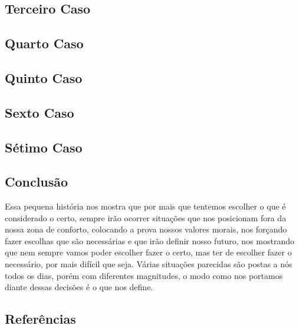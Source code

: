 \documentclass[12pt]{article}
\begin{document}
\subsection{Terceiro Caso} \label{sec:3sec}
\subsection{Quarto Caso} \label{sec:4sec}
\subsection{Quinto Caso} \label{sec:5sec}
\subsection{Sexto Caso} \label{sec:6sec}
\subsection{Sétimo Caso} \label{sec:7sec}

\subsection{Conclusão}

Essa pequena história nos mostra que por mais que tentemos escolher o que é considerado o certo, sempre irão ocorrer situações que nos posicionam fora da nossa zona de conforto, colocando a prova nossos valores morais, nos forçando fazer escolhas que são necessárias e que irão definir nosso futuro, nos mostrando que nem sempre vamos poder escolher fazer o certo, mas ter de escolher fazer o necessário, por mais difícil que seja. Várias situações parecidas são postas a nós todos os dias, porém com diferentes magnitudes, o modo como nos portamos diante dessas decisões é o que nos define.

\subsection{Referências}




\newpage

\end{document}
